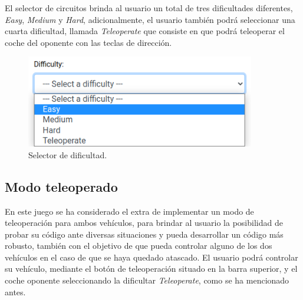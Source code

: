 \documentclass[a4paper, 12pt]{book}
\begin{document}
El selector de circuitos brinda al usuario un total de tres dificultades diferentes, \emph{Easy}, \emph{Medium} y \emph{Hard}, adicionalmente, el usuario también podrá seleccionar una cuarta dificultad, llamada \emph{Teleoperate} que consiste en que podrá teleoperar el coche del oponente con las teclas de dirección.

\begin{figure}[H]
	\centering
    \includegraphics[width=10cm]{img/difficulty_selector.png}
    \caption{Selector de dificultad.}
    \label{figura:difficulty_selector}
\end{figure}

\subsection{Modo teleoperado}
\label{follow_line_game_mode_teleoperado}

En este juego se ha considerado el extra de implementar un modo de teleoperación para ambos vehículos, para brindar al usuario la posibilidad de probar su código ante diversas situaciones y pueda desarrollar un código más robusto, también con el objetivo de que pueda controlar alguno de los dos vehículos en el caso de que se haya quedado atascado. El usuario podrá controlar su vehículo, mediante el botón de teleoperación situado en la barra superior, y el coche oponente seleccionando la dificultar \emph{Teleoperate}, como se ha mencionado antes.
\end{document}
